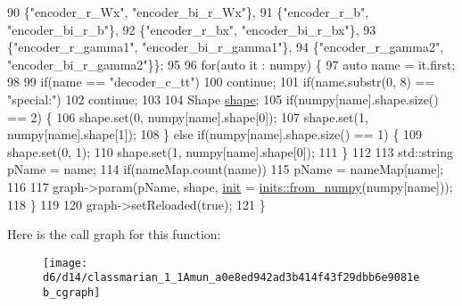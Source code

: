 \begin{DoxyCode}
90            \{\textcolor{stringliteral}{"encoder\_r\_Wx"}, \textcolor{stringliteral}{"encoder\_bi\_r\_Wx"}\},
91            \{\textcolor{stringliteral}{"encoder\_r\_b"}, \textcolor{stringliteral}{"encoder\_bi\_r\_b"}\},
92            \{\textcolor{stringliteral}{"encoder\_r\_bx"}, \textcolor{stringliteral}{"encoder\_bi\_r\_bx"}\},
93            \{\textcolor{stringliteral}{"encoder\_r\_gamma1"}, \textcolor{stringliteral}{"encoder\_bi\_r\_gamma1"}\},
94            \{\textcolor{stringliteral}{"encoder\_r\_gamma2"}, \textcolor{stringliteral}{"encoder\_bi\_r\_gamma2"}\}\};
95 
96     \textcolor{keywordflow}{for}(\textcolor{keyword}{auto} it : numpy) \{
97       \textcolor{keyword}{auto} name = it.first;
98 
99       \textcolor{keywordflow}{if}(name == \textcolor{stringliteral}{"decoder\_c\_tt"})
100         \textcolor{keywordflow}{continue};
101       \textcolor{keywordflow}{if}(name.substr(0, 8) == \textcolor{stringliteral}{"special:"})
102         \textcolor{keywordflow}{continue};
103 
104       Shape \hyperlink{namespacemarian_1_1keywords_a5933d683efd12b59e17a7131fa64cf1c}{shape};
105       \textcolor{keywordflow}{if}(numpy[name].shape.size() == 2) \{
106         shape.set(0, numpy[name].shape[0]);
107         shape.set(1, numpy[name].shape[1]);
108       \} \textcolor{keywordflow}{else} \textcolor{keywordflow}{if}(numpy[name].shape.size() == 1) \{
109         shape.set(0, 1);
110         shape.set(1, numpy[name].shape[0]);
111       \}
112 
113       std::string pName = name;
114       \textcolor{keywordflow}{if}(nameMap.count(name))
115         pName = nameMap[name];
116 
117       graph->param(pName, shape, \hyperlink{amunmt_8cpp_a2e8ddb8bd2f3405f554c9f2c52277f4b}{init} = \hyperlink{namespacemarian_1_1inits_a466e51fe497018f864f0fb9c0dd05200}{inits::from\_numpy}(numpy[name]));
118     \}
119 
120     graph->setReloaded(\textcolor{keyword}{true});
121   \}
\end{DoxyCode}


Here is the call graph for this function\+:
\nopagebreak
\begin{figure}[H]
\begin{center}
\leavevmode
\texttt{[image: d6/d14/classmarian\_1\_1Amun\_a0e8ed942ad3b414f43f29dbb6e9081eb\_cgraph]}
\end{center}
\end{figure}


